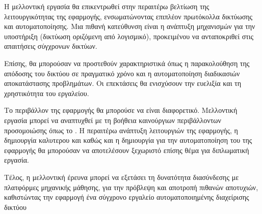 Η μελλοντική εργασία θα επικεντρωθεί στην περαιτέρω 
βελτίωση της λειτουργικότητας της εφαρμογής, ενσωματώνοντας 
επιπλέον πρωτόκολλα δικτύωσης και αυτοματοποίησης. 
Μια πιθανή κατεύθυνση είναι η ανάπτυξη μηχανισμών για την 
υποστήριξη  (δικτύωση οριζόμενη από λογισμικό), 
προκειμένου να ανταποκριθεί στις απαιτήσεις σύγχρονων δικτύων.

Επίσης, θα μπορούσαν να προστεθούν χαρακτηριστικά όπως 
η παρακολούθηση της απόδοσης του δικτύου σε πραγματικό 
χρόνο και η αυτοματοποίηση διαδικασιών αποκατάστασης προβλημάτων. 
Οι επεκτάσεις θα ενισχύσουν την ευελιξία και τη χρηστικότητα του 
εργαλείου.

Το περιβάλλον της εφαρμογής θα μπορούσε να είναι διαφορετικό.
Μελλοντική εργασία μπορεί να αναπτυχθεί με τη βοήθεια καινούργιων περιβάλλοντων προσομοιώσης όπως
το . Η περαιτέρω ανάπτυξη λειτουργιών της εφαρμογής, η δημιουργία καλυτερου 
και  καθώς και η δημιουργία  για την αυτοματοποίηση
του  της εφαρμογής θα μπορούσαν να αποτελέσουν ξεχωριστό επίσης θέμα για διπλωματική εργασία.

Τέλος, η μελλοντική έρευνα μπορεί να εξετάσει τη δυνατότητα διασύνδεσης με 
πλατφόρμες μηχανικής μάθησης, για την 
πρόβλεψη και αποτροπή πιθανών αποτυχιών, 
καθιστώντας την εφαρμογή ένα σύγχρονο εργαλείο 
αυτοματοποιημένης διαχείρισης δικτύου